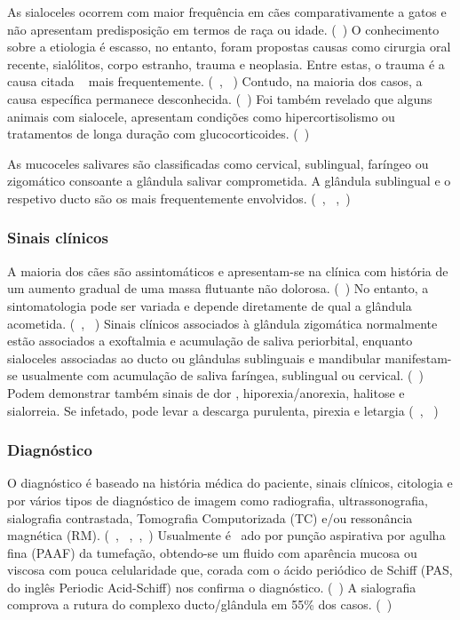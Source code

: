 As sialoceles ocorrem com maior frequência em cães comparativamente a gatos e não apresentam predisposição em termos de raça ou idade. (~\cite{Bae2024}) O conhecimento sobre a etiologia é escasso, no entanto, foram propostas causas como cirurgia oral recente, sialólitos, corpo estranho, trauma e neoplasia. Entre estas, o trauma é a causa citada ~\cite{Kumar2017} mais frequentemente. (~\cite{deLaPuerta2020}, ~\cite{Olimpo2023}) Contudo, na maioria dos casos, a causa específica permanece desconhecida. ({~\cite{Cinti2021}}) Foi também revelado que alguns animais com sialocele, apresentam condições como hipercortisolismo ou tratamentos de longa duração com glucocorticoides. (~\cite{Bae2024}) 


As mucoceles salivares são classificadas como cervical, sublingual, faríngeo ou zigomático consoante a glândula salivar comprometida. A glândula sublingual e o respetivo ducto são os mais frequentemente envolvidos. (~\cite{Poirier2018}, ~\cite{Cinti2021},~\cite{_salivary_})

\subsubsection{Sinais clínicos}

A maioria dos cães são assintomáticos e apresentam-se na clínica com história de um aumento gradual de uma massa flutuante não dolorosa. (~\cite{Poirier2018}) No entanto, a sintomatologia pode ser variada e depende diretamente de qual a glândula acometida. (~\cite{deLaPuerta2020}, ~\cite{_salivary_}) Sinais clínicos associados à glândula zigomática normalmente estão associados a exoftalmia e acumulação de saliva periorbital, enquanto sialoceles associadas  ao ducto ou glândulas sublinguais e mandibular manifestam-se usualmente com acumulação de saliva faríngea, sublingual ou cervical. (~\cite{_salivary_}) Podem demonstrar também sinais de dor , hiporexia/anorexia, halitose e sialorreia.  Se infetado, pode levar a descarga purulenta, pirexia e letargia (~\cite{_salivary_}, ~\cite{Swieton2022})

\subsubsection{Diagnóstico}

O diagnóstico é baseado na história médica do paciente, sinais clínicos, citologia e por vários tipos de diagnóstico de imagem como radiografia, ultrassonografia, sialografia contrastada, Tomografia Computorizada (TC) e/ou ressonância magnética (RM). (~\cite{Bae2024}, ~\cite{_salivary_},~\cite{Olimpo2023},~\cite{deLaPuerta2020}) Usualmente é ~\cite{Kumar2017}ado por punção aspirativa por agulha fina (PAAF) da tumefação, obtendo-se um fluido com aparência mucosa ou viscosa com pouca celularidade que, corada com o ácido periódico de Schiff (PAS, do inglês Periodic Acid-Schiff) nos confirma o diagnóstico. (~\cite{Poirier2018}) A sialografia comprova  a rutura do complexo ducto/glândula em 55\% dos casos. (~\cite{Olimpo2023}) 

